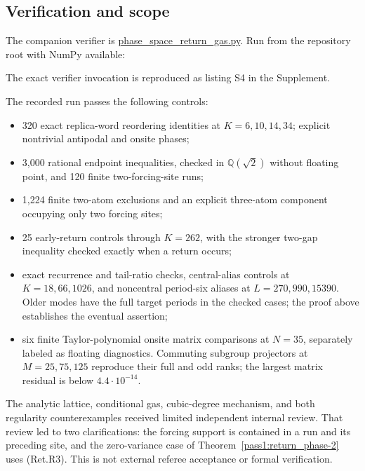 \hypertarget{verification-and-scope}{%
\subsection{Verification and scope}\label{verification-and-scope}}

The companion verifier is
\href{https://github.com/ChurilovMaksim/BGS/blob/main/computations/verification/phase_space_return_gas.py}{phase\_space\_return\_gas.py}.
Run from the repository root with NumPy available:

The exact verifier invocation is reproduced as listing S4 in the Supplement.

The recorded run passes the following controls:

\begin{itemize}
\tightlist
\item
  320 exact replica-word reordering identities at \(K=6,10,14,34\);
  explicit nontrivial antipodal and onsite phases;
\item
  3,000 rational endpoint inequalities, checked in
  \(\mathbb Q(\sqrt2)\) without floating point, and 120 finite
  two-forcing-site runs;
\item
  1,224 finite two-atom exclusions and an explicit three-atom component
  occupying only two forcing sites;
\item
  25 early-return controls through \(K=262\), with the stronger two-gap
  inequality checked exactly when a return occurs;
\item
  exact recurrence and tail-ratio checks, central-alias controls at
  \(K=18,66,1026\), and noncentral period-six aliases at
  \(L=270,990,15390\). Older modes have the full target periods in
  the checked cases; the proof above establishes the eventual assertion;
\item
  six finite Taylor-polynomial onsite matrix comparisons at \(N=35\),
  separately labeled as floating diagnostics. Commuting subgroup
  projectors at \(M=25,75,125\) reproduce their full and odd ranks;
  the largest matrix residual is below \(4.4\cdot10^{-14}\).
\end{itemize}

The analytic lattice, conditional gas, cubic-degree mechanism, and both
regularity counterexamples received limited independent internal review.
That review led to two clarifications: the forcing support is
contained in a run and its preceding site, and the zero-variance
case of Theorem~\ref{pass1:return_phase-2} uses (Ret.R3). This is not external referee acceptance
or formal verification.

